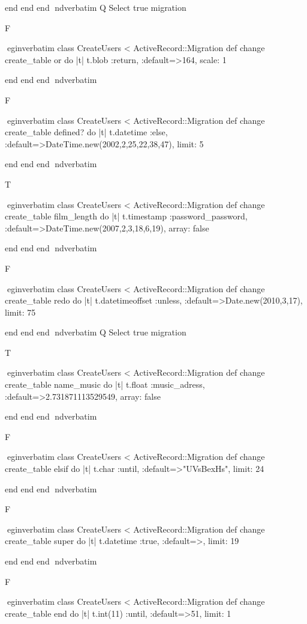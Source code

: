     end 
  end 
end
nd{verbatim}
Q
 Select true migration

F

egin{verbatim}
 class CreateUsers < ActiveRecord::Migration 
  def change 
    create_table or do |t| 
      t.blob :return, :default=>164, scale: 1
    
    end 
  end 
end
nd{verbatim}

F

egin{verbatim}
 class CreateUsers < ActiveRecord::Migration 
  def change 
    create_table defined? do |t| 
      t.datetime :else, :default=>DateTime.new(2002,2,25,22,38,47), limit: 5
    
    end 
  end 
end
nd{verbatim}

T

egin{verbatim}
 class CreateUsers < ActiveRecord::Migration 
  def change 
    create_table film_length do |t| 
      t.timestamp :password_password, :default=>DateTime.new(2007,2,3,18,6,19), array: false
    
    end 
  end 
end
nd{verbatim}

F

egin{verbatim}
 class CreateUsers < ActiveRecord::Migration 
  def change 
    create_table redo do |t| 
      t.datetimeoffset :unless, :default=>Date.new(2010,3,17), limit: 75
    
    end 
  end 
end
nd{verbatim}
Q
 Select true migration

T

egin{verbatim}
 class CreateUsers < ActiveRecord::Migration 
  def change 
    create_table name_music do |t| 
      t.float :music_adress, :default=>2.731871113529549, array: false
    
    end 
  end 
end
nd{verbatim}

F

egin{verbatim}
 class CreateUsers < ActiveRecord::Migration 
  def change 
    create_table elsif do |t| 
      t.char :until, :default=>"UVsBexHs", limit: 24
    
    end 
  end 
end
nd{verbatim}

F

egin{verbatim}
 class CreateUsers < ActiveRecord::Migration 
  def change 
    create_table super do |t| 
      t.datetime :true, :default=>, limit: 19
    
    end 
  end 
end
nd{verbatim}

F

egin{verbatim}
 class CreateUsers < ActiveRecord::Migration 
  def change 
    create_table end do |t| 
      t.int(11) :until, :default=>51, limit: 1
    
